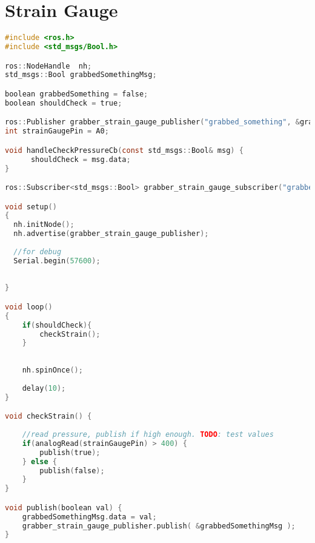 \section{Strain Gauge}\label{sec:StrainGauge}
\begin{lstlisting}[language=C]
#include <ros.h>
#include <std_msgs/Bool.h>

ros::NodeHandle  nh;
std_msgs::Bool grabbedSomethingMsg;

boolean grabbedSomething = false;
boolean shouldCheck = true;

ros::Publisher grabber_strain_gauge_publisher("grabbed_something", &grabbedSomethingMsg);
int strainGaugePin = A0;

void handleCheckPressureCb(const std_msgs::Bool& msg) {  
      shouldCheck = msg.data;
}

ros::Subscriber<std_msgs::Bool> grabber_strain_gauge_subscriber("grabber_check_pressure", &handleCheckPressureCb);

void setup()
{
  nh.initNode();
  nh.advertise(grabber_strain_gauge_publisher);
  
  //for debug
  Serial.begin(57600);
  
  
}

void loop()
{
    if(shouldCheck){
        checkStrain();
    }
    
    
    nh.spinOnce();
  
    delay(10);
}

void checkStrain() {
  
    //read pressure, publish if high enough. TODO: test values
    if(analogRead(strainGaugePin) > 400) {
        publish(true);
    } else {
        publish(false);
    }
}

void publish(boolean val) {
    grabbedSomethingMsg.data = val;
    grabber_strain_gauge_publisher.publish( &grabbedSomethingMsg );
}
\end{lstlisting}